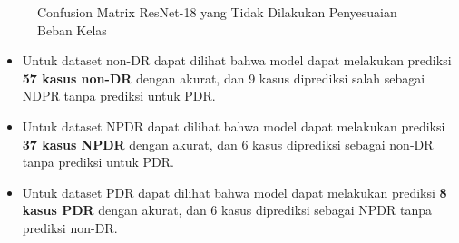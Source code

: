\begin{figure}[hbtp]
	\centering
	\qquad
	\qquad
	\caption{Confusion Matrix ResNet-18 yang Tidak Dilakukan Penyesuaian Beban Kelas}
	\label{fig:confRes18}
\end{figure}

\begin{itemize}
	\item Untuk dataset non-DR dapat dilihat bahwa model dapat melakukan prediksi \textbf{57 kasus non-DR} dengan akurat, dan 9 kasus diprediksi salah sebagai NDPR tanpa prediksi untuk PDR.
	
	\item Untuk dataset NPDR dapat dilihat bahwa model dapat melakukan prediksi \textbf{37 kasus NPDR} dengan akurat, dan 6 kasus diprediksi sebagai non-DR tanpa prediksi untuk PDR.
	
	\item Untuk dataset PDR dapat dilihat bahwa model dapat melakukan prediksi \textbf{8 kasus PDR} dengan akurat, dan 6 kasus diprediksi sebagai NPDR tanpa prediksi non-DR.
\end{itemize}
\pagebreak


